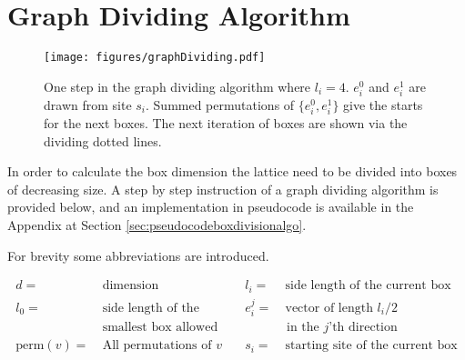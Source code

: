 


\section{Graph Dividing Algorithm}
\label{sec:GraphDivisonAlgorithm}

\begin{figure}[h!]
    \centering
        \texttt{[image: figures/graphDividing.pdf]}
    \caption{One step in the graph dividing algorithm where $l_i = 4$. $e^0_i$ and $e^1_i$ are drawn from site $s_i$. Summed permutations of $\{e^0_i, e^1_i\}$ give the starts for the next boxes. The next iteration of boxes are shown via the dividing dotted lines.}
    \label{fig:graphdividingalgo}
\end{figure}

In order to calculate the box dimension the lattice need to be divided into boxes of decreasing size. A step by step instruction of a graph dividing algorithm is provided below, and an implementation in pseudocode is available in the Appendix at Section \ref{sec:pseudocodeboxdivisionalgo}.

For brevity some abbreviations are introduced.

\begin{equation*}
    \begin{aligned}
        d =& \ \text{dimension} &\quad l_i =& \ \text{side length of the current box}\\
%
        l_0 =& \ \text{side length of the} &\quad e_i^j =& \ \text{vector of length } l_i / 2 \\
%
             & \ \text{smallest box allowed} & & \text{ in the }j\text{'th direction} \\
%
        \text{perm}(v) =& \ \text{All permutations of } v &\quad s_i =& \ \text{starting site of the current box}
    \end{aligned}
\end{equation*}

